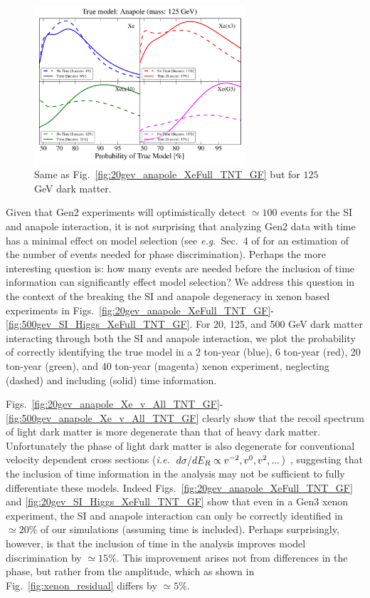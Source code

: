 \documentclass[11pt]{article}
\newcommand{\ie}{{\it i.e.~}}  \newcommand{\eg}{{\it e.g.~}}
\newcommand{\Fig}[1]{Fig.~\ref{#1}} \newcommand{\Figs}[2]{Figs.~\ref{#1} and \ref{#2}}
\begin{document}
\begin{figure}
\centering
\includegraphics[width=0.7\textwidth]{plots/PDF_125GeV_Anapole_50sims_Xe_Xe3x_Xe10x_XeG3_GF_TNT.pdf}
\caption{\label{fig:125gev_anapole_XeFull_TNT_GF}
Same as Fig.~\ref{fig:20gev_anapole_XeFull_TNT_GF} but for $125$ GeV dark matter.}
\end{figure}

Given that Gen2 experiments will optimistically detect $\simeq 100$ events for the SI and anapole interaction, it is not surprising that analyzing Gen2 data with time has a minimal effect on model selection (see \eg Sec.~4 of \cite{DelNobile:2015nua} for an estimation of the number of events needed for phase discrimination). Perhaps the more interesting question is: how many events are needed before the inclusion of time information can significantly effect model selection? We address this question in the context of the breaking the SI and anapole degeneracy in xenon based experiments in Figs.~\ref{fig:20gev_anapole_XeFull_TNT_GF}-\ref{fig:500gev_SI_Higgs_XeFull_TNT_GF}. For 20, 125, and 500 GeV dark matter interacting through both the SI and anapole interaction, we plot the probability of correctly identifying the true model in a 2 ton-year (blue), 6 ton-year (red), 20 ton-year (green), and 40 ton-year (magenta) xenon experiment, neglecting (dashed) and including (solid) time information. 

Figs.~\ref{fig:20gev_anapole_Xe_v_All_TNT_GF}-\ref{fig:500gev_anapole_Xe_v_All_TNT_GF} clearly show that the recoil spectrum of light dark matter is more degenerate than that of heavy dark matter. Unfortunately the phase of light dark matter is also degenerate for conventional velocity dependent cross sections (\ie $d\sigma/dE_R \propto v^{-2}, v^0, v^2, ...$)~\cite{DelNobile:2015tza,DelNobile:2015rmp}, suggesting that the inclusion of time information in the analysis may not be sufficient to fully differentiate these models. Indeed \Figs{fig:20gev_anapole_XeFull_TNT_GF}{fig:20gev_SI_Higgs_XeFull_TNT_GF} show that even in a Gen3 xenon experiment, the SI and anapole interaction can only be correctly identified in $\simeq 20\%$ of our simulations (assuming time is included). Perhaps surprisingly, however, is that the inclusion of time in the analysis improves model discrimination by $\simeq 15\%$. This improvement arises not from differences in the phase, but rather from the amplitude, which as shown in \Fig{fig:xenon_residual} differs by $\simeq 5\%$.
\end{document}

